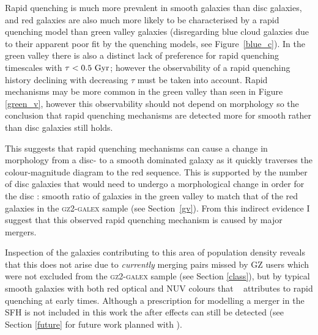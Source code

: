 Rapid quenching is much more prevalent in smooth galaxies than disc galaxies, and red galaxies are also much more likely to be characterised by a rapid quenching model than green valley galaxies (disregarding blue cloud galaxies due to their apparent poor fit by the quenching models, see Figure~\ref{blue_c}). In the green valley there is also a distinct lack of preference for rapid quenching timescales with $\tau < 0.5~\rm{Gyr}$; however the observability of a rapid quenching history declining with decreasing $\tau$ must be taken into account. Rapid mechanisms may be more common in the green valley than seen in Figure \ref{green_v}, however this observability should not depend on morphology so the conclusion that rapid quenching mechanisms are detected more for smooth rather than disc galaxies still holds. 

This suggests that rapid quenching mechanisms can cause a change in morphology from a disc- to a smooth dominated galaxy as it quickly traverses the colour-magnitude diagram to the red sequence. This is supported by the number of disc galaxies that would need to undergo a morphological change in order for the disc : smooth ratio of galaxies in the green valley to match that of the red galaxies in the \textsc{gz2-galex} sample (see Section~\ref{gv}). From this indirect evidence I suggest that this observed rapid quenching mechanism is caused by major mergers.

Inspection of the galaxies contributing to this area of population density reveals that this does not arise due to \emph{currently} merging pairs missed by GZ users which were not excluded from the \textsc{gz2-galex} sample (see Section \ref{class}), but by typical smooth galaxies with both red optical and NUV colours that \starpy~ attributes to rapid quenching at early times. Although a prescription for modelling a merger in the SFH is not included in this work the after effects can still be detected (see Section \ref{future} for future work planned with \starpy).

